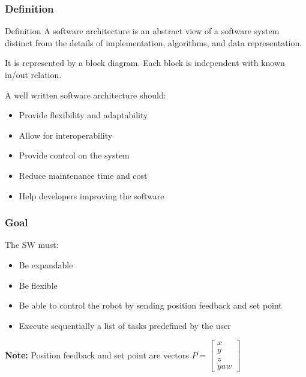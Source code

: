 \documentclass[xcolor=dvipsnames]{beamer}
\begin{document}
\begin{frame}
\tableofcontents[sectionstyle=show,square,currentsection]
\end{frame}

\begin{frame}[t]
\frametitle{Definition}
\begin{block}{Definition}
A software architecture is an abstract view of a software system distinct from the details of implementation, algorithms, and data representation.
\end{block}

It is represented by a block diagram. Each block is independent with known in/out relation.
\vspace{1ex}

A well written software architecture should:
 \begin{itemize}
 \item Provide flexibility and adaptability
 \item Allow for interoperability 
 \item Provide control on the system
 \item Reduce maintenance time and cost
 \item Help developers improving the software
 \end{itemize}

\end{frame}

\begin{frame}
\frametitle{Goal}
The SW must:\begin{itemize}
\item Be expandable
\item Be flexible
\item Be able to control the robot by sending position feedback and set point
\item Execute sequentially a list of tasks predefined by the user
\end{itemize}

\vspace{2em}
\textbf{Note: }Position feedback and set point are vectors $P = \begin{bmatrix}
x\\y\\z\\yaw
\end{bmatrix}$
\end{frame}
\end{document}
